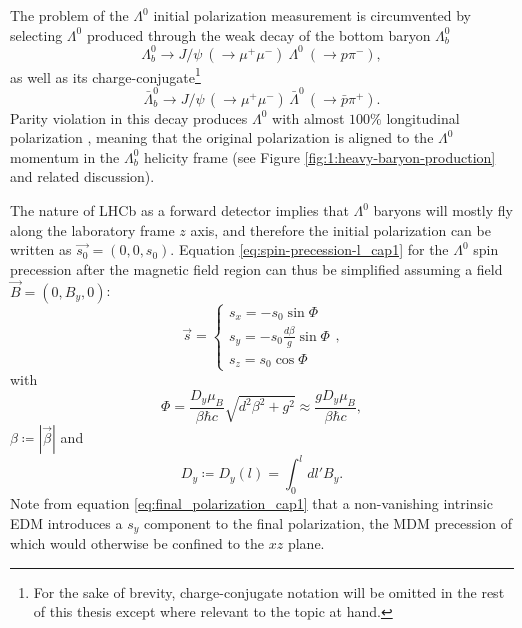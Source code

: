 The problem of the $\Lambda^0$ initial polarization measurement is circumvented by selecting $\Lambda^0$ produced through the weak decay of the bottom baryon $\Lambda_b^0$
\begin{equation}
\Lambda_b^0 \rightarrow J/\psi~(\rightarrow \mu^+ \mu^-)~\Lambda^0~(\rightarrow p \pi^-),
\label{eq:demonstrator_cap1}  
\end{equation}
as well as its charge-conjugate\footnote{For the sake of brevity, charge-conjugate notation will be omitted in the rest of this thesis except where relevant to the topic at hand.}
\begin{equation}
\bar{\Lambda}_b^0 \rightarrow J/\psi \, (\rightarrow \mu^+ \mu^-) \,\bar{\Lambda}^0 \, (\rightarrow \bar{p} \pi^+).
\label{eq:antidemonstrator_cap1}  
\end{equation}
Parity violation in this decay produces $\Lambda^0$ with almost $100\%$ longitudinal polarization \cite{ATLASLambdaPolarization}, meaning that the original polarization is aligned to the $\Lambda^0$ momentum in the $\Lambda_b^0$ helicity frame (see Figure \ref{fig:1:heavy-baryon-production} and related discussion).

The nature of LHCb as a forward detector implies that $\Lambda^0$ baryons will mostly fly along the laboratory frame $z$ axis, and therefore the initial polarization can be written as $\vec{s_0} = (0,0,s_0)$. Equation \eqref{eq:spin-precession-l_cap1} for the $\Lambda^0$ spin precession after the magnetic field region can thus be simplified assuming a field $\vec{B} = (0,B_y,0)$:
\begin{equation}
\vec{s} =
\begin{cases}
	s_x = -s_0 \sin\Phi\\
	s_y = -s_0 \frac{d\beta}{g} \sin\Phi \\
	s_z = s_0 \cos\Phi
\end{cases},
\label{eq:final_polarization_cap1}
\end{equation}
with
\begin{equation}
\Phi
=
\frac{D_y \mu_B}{\beta \hbar c} \sqrt{d^2 \beta^2 + g^2}
\approx
\frac{g D_y \mu_B}{\beta \hbar c}
,
\end{equation}
$\beta \coloneqq \left\lvert \vec{\beta} \right\rvert$ and
\begin{equation}
D_y \coloneqq D_y (l) = \int_0^l dl' B_y.
\end{equation}
Note from equation \eqref{eq:final_polarization_cap1} that a non-vanishing intrinsic EDM introduces a $s_y$ component to the final polarization, the MDM precession of which would otherwise be confined to the $xz$ plane.

